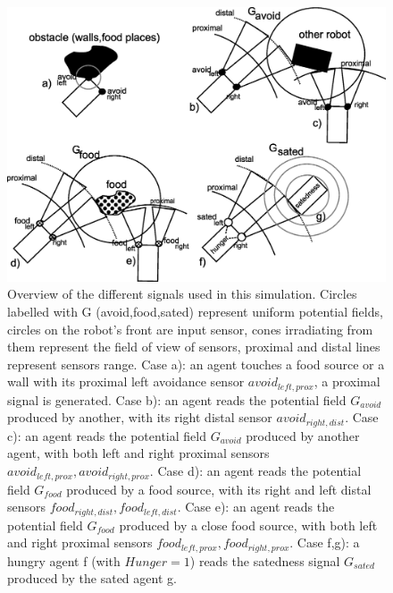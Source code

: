 \begin{figure}[htbp]
\begin{center}
\includegraphics[scale=0.4]{figures/socialadapt/RobotScenario.eps}
\end{center}
\small{
\caption[Social computational model]{Overview of the different signals used in this simulation. 
Circles labelled with G (avoid,food,sated) represent uniform potential fields, circles on 
the robot's front are input sensor, cones irradiating from them represent the field of view 
of sensors, proximal and distal lines represent sensors range. Case a): an agent touches 
a food source or a wall with its proximal left avoidance sensor $avoid_{left,prox}$, 
a proximal signal is generated. Case b): an agent reads the potential field $G_{avoid}$ 
produced by another, with its right distal sensor $avoid_{right,dist}$. Case c): 
an agent reads the potential field $G_{avoid}$ produced by another agent, with 
both left and right proximal sensors $avoid_{left,prox},avoid_{right,prox}$. 
Case d): an agent reads the potential field $G_{food}$ produced by a food source, 
with its right and left distal sensors $food_{right,dist},food_{left,dist}$. 
Case e): an agent reads the potential field $G_{food}$ produced by a close 
food source, with both left and right proximal sensors $food_{left,prox},food_{right,prox}$. 
Case f,g): a hungry agent f (with $Hunger=1$) reads the satedness signal $G_{sated}$ 
produced by the sated agent g. \label{fig:sensors}
}}
\end{figure}

